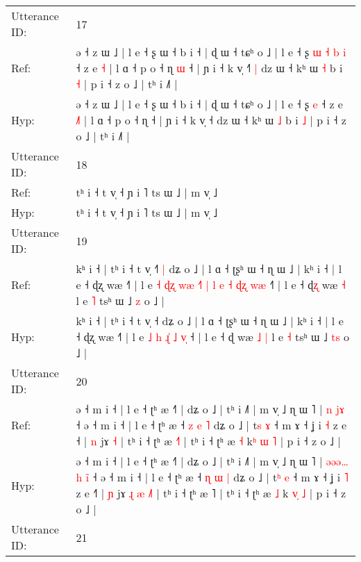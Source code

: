 \documentclass[10pt]{article}
\DeclareRobustCommand{\hl}[1]{{\textcolor{red}{#1}}}
\begin{document}
\begin{longtable}{ll}
 \\
\midrule
Utterance ID: & 17 \\
Ref: & ə ˧ z ɯ ˩ | l e ˧ ʂ ɯ ˧ b i ˧ | ɖ ɯ ˧ tɕʰ o ˩ | l e ˧ ʂ\hl{ }\hl{ɯ}\hl{ }\hl{˧}\hl{ }\hl{b} \hl{i} ˧ z e \hl{}\hl{˧} | l ɑ ˧ p o ˧ ɳ\hl{ }\hl{ɯ} ˧ | ɲ i ˧ k v̩ ˧\hl{˥}\hl{ }\hl{|} dz ɯ ˧ kʰ ɯ \hl{˧} b i \hl{˧} | p i ˧ z o ˩ | tʰ i ˩˥ |
 \\
Hyp: & ə ˧ z ɯ ˩ | l e ˧ ʂ ɯ ˧ b i ˧ | ɖ ɯ ˧ tɕʰ o ˩ | l e ˧ ʂ\hl{}\hl{}\hl{}\hl{}\hl{}\hl{} \hl{e} ˧ z e \hl{˩}\hl{˥} | l ɑ ˧ p o ˧ ɳ\hl{}\hl{} ˧ | ɲ i ˧ k v̩ ˧\hl{}\hl{}\hl{} dz ɯ ˧ kʰ ɯ \hl{˩} b i \hl{˩} | p i ˧ z o ˩ | tʰ i ˩˥ |
 \\
\midrule
Utterance ID: & 18 \\
Ref: & tʰ i ˧ t v̩ ˧ ɲ i ˥ ts ɯ ˩ | m v̩ ˩
 \\
Hyp: & tʰ i ˧ t v̩ ˧ ɲ i ˥ ts ɯ ˩ | m v̩ ˩
 \\
\midrule
Utterance ID: & 19 \\
Ref: & kʰ i ˧ | tʰ i ˧ t v̩ ˧\hl{˥}\hl{ }\hl{|} dʑ o ˩ | l ɑ ˧ ʈʂʰ ɯ ˧ ɳ ɯ ˩ | kʰ i ˧ | l e ˧ ɖʐ wæ ˧˥ | l e\hl{ }\hl{˧}\hl{ }\hl{ɖ}\hl{ʐ}\hl{ }\hl{w}\hl{æ}\hl{ }\hl{˧}\hl{˥} \hl{|} \hl{l} \hl{e}\hl{ }\hl{˧} \hl{ɖ}\hl{ʐ} \hl{w}\hl{æ} ˧\hl{˥} | l e ˧ ɖ\hl{ʐ} wæ\hl{}\hl{} \hl{˧} l e \hl{˥} tsʰ ɯ ˩ \hl{}\hl{z} o ˩ |
 \\
Hyp: & kʰ i ˧ | tʰ i ˧ t v̩ ˧\hl{}\hl{}\hl{} dʑ o ˩ | l ɑ ˧ ʈʂʰ ɯ ˧ ɳ ɯ ˩ | kʰ i ˧ | l e ˧ ɖʐ wæ ˧˥ | l e\hl{}\hl{}\hl{}\hl{}\hl{}\hl{}\hl{}\hl{}\hl{}\hl{}\hl{} \hl{˩} \hl{h} \hl{}\hl{ɻ}\hl{̍} \hl{}\hl{˩} \hl{v}\hl{̩} ˧\hl{} | l e ˧ ɖ\hl{} wæ\hl{ }\hl{˩} \hl{|} l e \hl{˧} tsʰ ɯ ˩ \hl{t}\hl{s} o ˩ |
 \\
\midrule
Utterance ID: & 20 \\
Ref: & ə ˧ m i ˧ | l e ˧ ʈʰ æ ˧˥ | dʑ o ˩ | tʰ i ˩˥ | m v̩ ˩ ɳ ɯ ˥ |\hl{}\hl{}\hl{}\hl{}\hl{} \hl{n} \hl{j}\hl{ɤ} ˧ ə ˧ m i ˧ | l e ˧ ʈʰ æ ˧ \hl{z} \hl{e} \hl{˥} dʑ o ˩ | t\hl{s} \hl{ɤ} ˧ m ɤ ˧ ʝ i \hl{˧} z e ˧\hl{} | \hl{n} jɤ\hl{}\hl{}\hl{}\hl{} \hl{}\hl{˧} | tʰ i ˧ ʈʰ æ \hl{˧}˥ | tʰ i ˧ ʈʰ æ \hl{˧} k\hl{ʰ}\hl{ }\hl{ɯ} \hl{˥} | p i ˧ z o ˩ |
 \\
Hyp: & ə ˧ m i ˧ | l e ˧ ʈʰ æ ˧˥ | dʑ o ˩ | tʰ i ˩˥ | m v̩ ˩ ɳ ɯ ˥ |\hl{ }\hl{ə}\hl{ə}\hl{ə}\hl{…} \hl{h} \hl{i}\hl{̃} ˧ ə ˧ m i ˧ | l e ˧ ʈʰ æ ˧ \hl{ɳ} \hl{ɯ} \hl{|} dʑ o ˩ | t\hl{ʰ} \hl{e} ˧ m ɤ ˧ ʝ i \hl{˥} z e ˧\hl{˥} | \hl{ɲ} jɤ\hl{ }\hl{ɻ}\hl{ }\hl{æ} \hl{˩}\hl{˥} | tʰ i ˧ ʈʰ æ \hl{}˥ | tʰ i ˧ ʈʰ æ \hl{˩} k\hl{ }\hl{v}\hl{̩} \hl{˩} | p i ˧ z o ˩ |
 \\
\midrule
Utterance ID: & 21 \\

\end{longtable}
\end{document}
